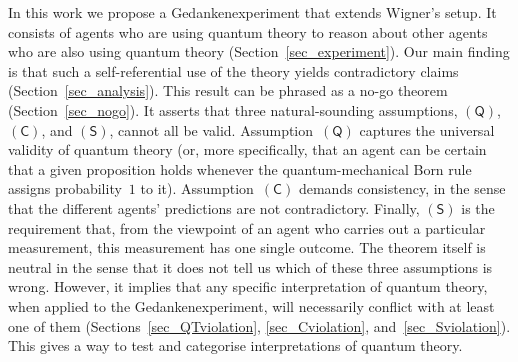 \documentclass[12pt]{article}
\theoremstyle{mystyle}
\theoremstyle{definition}
\newcommand*{\QT}{\mathsf{(Q)}}
\newcommand*{\SW}{\mathsf{(S)}}
\newcommand*{\SelfCons}{\mathsf{(C)}}
\begin{document}
In this work we propose a Gedankenexperiment that extends Wigner's setup. It consists of agents who are using quantum theory to reason about other agents who are also using quantum theory (Section~\ref{sec_experiment}). Our main finding is that such a self-referential use of the theory yields contradictory claims (Section~\ref{sec_analysis}). This result can be phrased as a no-go theorem (Section~\ref{sec_nogo}). It asserts that three natural-sounding assumptions, $\QT$, $\SelfCons$, and $\SW$, cannot all be valid.  Assumption~$\QT$ captures the universal validity of quantum theory (or, more specifically, that an agent can be certain that a given proposition holds whenever the quantum-mechanical Born rule assigns probability~$1$ to it).  Assumption~$\SelfCons$ demands consistency, in the sense that the different agents' predictions are not contradictory. Finally, $\SW$ is the requirement that, from  the viewpoint of an agent who carries out a particular measurement, this measurement has one single outcome. The  theorem itself is neutral in the sense that it does not tell us which of these three assumptions is wrong. However, it implies that any specific interpretation of quantum theory, when applied to the Gedankenexperiment, will necessarily conflict with at least one of them (Sections~\ref{sec_QTviolation}, \ref{sec_Cviolation}, and~\ref{sec_Sviolation}). This gives a way to test and categorise interpretations of quantum theory.
 
\end{document}
